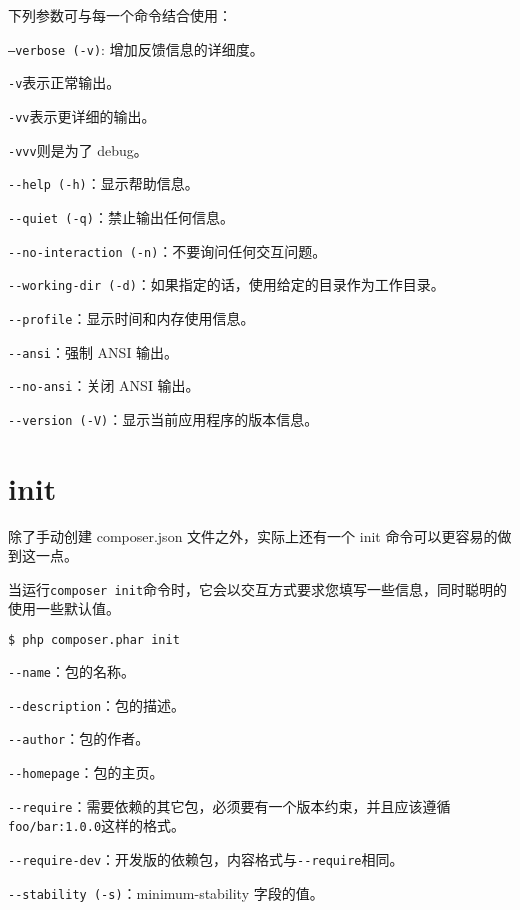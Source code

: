 下列参数可与每一个命令结合使用：

\begin{compactenum}
\item \texttt{--verbose (-v)}: 增加反馈信息的详细度。

\begin{compactitem}
\item \texttt{-v}表示正常输出。
\item \texttt{-vv}表示更详细的输出。
\item \texttt{-vvv}则是为了 debug。
\end{compactitem}

\item \texttt{-\/-help (-h)}：显示帮助信息。
\item \texttt{-\/-quiet (-q)}：禁止输出任何信息。
\item \texttt{-\/-no-interaction (-n)}：不要询问任何交互问题。
\item \texttt{-\/-working-dir (-d)}：如果指定的话，使用给定的目录作为工作目录。
\item \texttt{-\/-profile}：显示时间和内存使用信息。
\item \texttt{-\/-ansi}：强制 ANSI 输出。
\item \texttt{-\/-no-ansi}：关闭 ANSI 输出。
\item \texttt{-\/-version (-V)}：显示当前应用程序的版本信息。
\end{compactenum}






\section{init}

除了手动创建 composer.json 文件之外，实际上还有一个 init 命令可以更容易的做到这一点。

当运行\texttt{composer init}命令时，它会以交互方式要求您填写一些信息，同时聪明的使用一些默认值。

\begin{lstlisting}[language=bash]
$ php composer.phar init
\end{lstlisting}

\begin{compactitem}
\item \texttt{-\/-name}：包的名称。
\item \texttt{-\/-description}：包的描述。
\item \texttt{-\/-author}：包的作者。
\item \texttt{-\/-homepage}：包的主页。
\item \texttt{-\/-require}：需要依赖的其它包，必须要有一个版本约束，并且应该遵循\texttt{foo/bar:1.0.0}这样的格式。
\item \texttt{-\/-require-dev}：开发版的依赖包，内容格式与\texttt{-\/-require}相同。
\item \texttt{-\/-stability (-s)}：minimum-stability 字段的值。
\end{compactitem}


